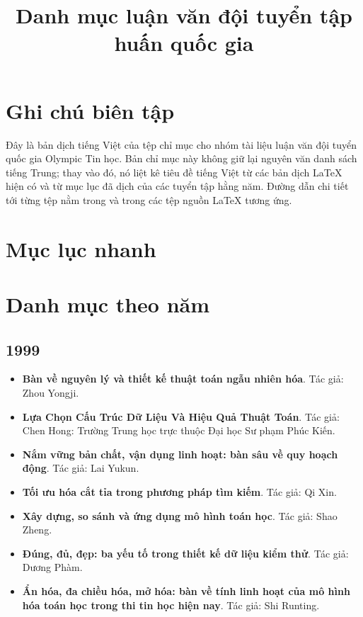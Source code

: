 \documentclass[11pt]{article}
\title{Danh mục luận văn đội tuyển tập huấn quốc gia}
\author{}
\date{}
\begin{document}
\maketitle

\section*{Ghi chú biên tập}
Đây là bản dịch tiếng Việt của tệp chỉ mục cho nhóm tài liệu luận văn đội
tuyển quốc gia Olympic Tin học. Bản chỉ mục này không giữ lại nguyên văn
danh sách tiếng Trung; thay vào đó, nó liệt kê tiêu đề tiếng Việt từ các
bản dịch LaTeX hiện có và từ mục lục đã dịch của các tuyển tập hằng năm.
Đường dẫn chi tiết tới từng tệp nằm trong  và trong
các tệp nguồn LaTeX tương ứng.

\section*{Mục lục nhanh}
\tableofcontents
\bigskip

\section{Danh mục theo năm}

\subsection{1999}
\begin{itemize}[leftmargin=2em]
  \item \textbf{Bàn về nguyên lý và thiết kế thuật toán ngẫu nhiên hóa}. Tác giả: Zhou Yongji.
  \item \textbf{Lựa Chọn Cấu Trúc Dữ Liệu Và Hiệu Quả Thuật Toán}. Tác giả: Chen Hong: Trường Trung học trực thuộc Đại học Sư phạm Phúc Kiến.
  \item \textbf{Nắm vững bản chất, vận dụng linh hoạt: bàn sâu về quy hoạch động}. Tác giả: Lai Yukun.
  \item \textbf{Tối ưu hóa cắt tỉa trong phương pháp tìm kiếm}. Tác giả: Qi Xin.
  \item \textbf{Xây dựng, so sánh và ứng dụng mô hình toán học}. Tác giả: Shao Zheng.
  \item \textbf{Đúng, đủ, đẹp: ba yếu tố trong thiết kế dữ liệu kiểm thử}. Tác giả: Dương Phàm.
  \item \textbf{Ẩn hóa, đa chiều hóa, mở hóa: bàn về tính linh hoạt của mô hình hóa toán học trong thi tin học hiện nay}. Tác giả: Shi Runting.
\end{itemize}
\end{document}
